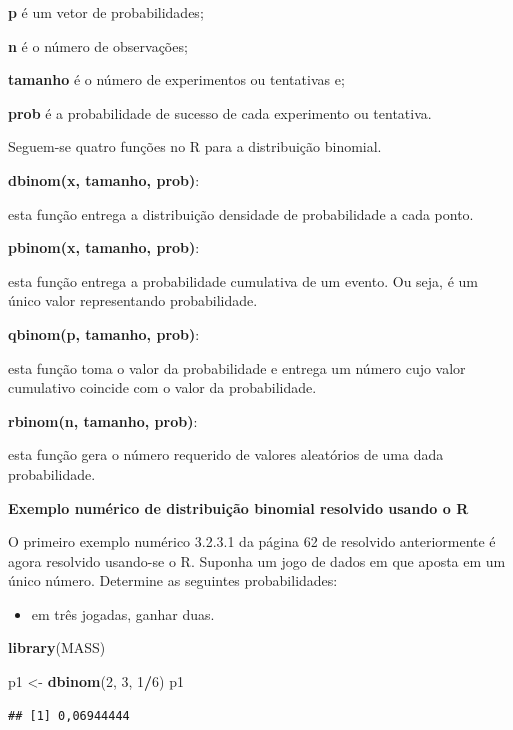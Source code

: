 \documentclass[
]{book}
\newenvironment{Shaded}{\begin{snugshade}}{\end{snugshade}}
\newcommand{\DecValTok}[1]{\textcolor[rgb]{0.00,0.00,0.81}{#1}}
\newcommand{\KeywordTok}[1]{\textcolor[rgb]{0.13,0.29,0.53}{\textbf{#1}}}
\newcommand{\NormalTok}[1]{#1}
\newcommand{\OperatorTok}[1]{\textcolor[rgb]{0.81,0.36,0.00}{\textbf{#1}}}
\newcommand{\StringTok}[1]{\textcolor[rgb]{0.31,0.60,0.02}{#1}}
\providecommand{\tightlist}{%
  \setlength{\itemsep}{0pt}\setlength{\parskip}{0pt}}
\begin{document}
\textbf{p} é um vetor de probabilidades;

\textbf{n} é o número de observações;

\textbf{tamanho} é o número de experimentos ou tentativas e;

\textbf{prob} é a probabilidade de sucesso de cada experimento ou tentativa.

Seguem-se quatro funções no R para a distribuição binomial.

\textbf{dbinom(x, tamanho, prob)}:

esta função entrega a distribuição densidade de probabilidade a cada ponto.

\textbf{pbinom(x, tamanho, prob)}:

esta função entrega a probabilidade cumulativa de um evento. Ou seja, é um único valor representando probabilidade.

\textbf{qbinom(p, tamanho, prob)}:

esta função toma o valor da probabilidade e entrega um número cujo valor cumulativo coincide com o valor da probabilidade.

\textbf{rbinom(n, tamanho, prob)}:

esta função gera o número requerido de valores aleatórios de uma dada probabilidade.

\textbf{Exemplo numérico de distribuição binomial resolvido usando o R}

O primeiro exemplo numérico 3.2.3.1 da página 62 de \citet{Sartoris2013} resolvido anteriormente é agora resolvido usando-se o R. Suponha um jogo de dados em que aposta em um único número. Determine as seguintes probabilidades:

\begin{itemize}
\tightlist
\item
  em três jogadas, ganhar duas.
\end{itemize}

\begin{Shaded}
\begin{Highlighting}[]
\KeywordTok{library}\NormalTok{(MASS)}

\NormalTok{p1 <-}\StringTok{ }\KeywordTok{dbinom}\NormalTok{(}\DecValTok{2}\NormalTok{, }\DecValTok{3}\NormalTok{, }\DecValTok{1}\OperatorTok{/}\DecValTok{6}\NormalTok{)}
\NormalTok{p1}
\end{Highlighting}
\end{Shaded}

\begin{verbatim}
## [1] 0,06944444
\end{verbatim}
\end{document}
